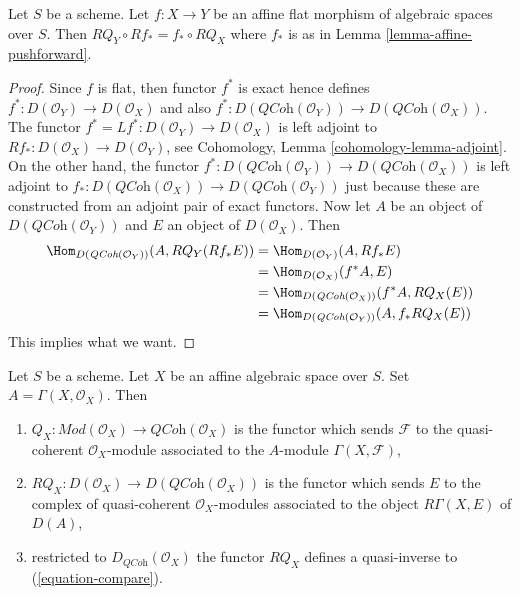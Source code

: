 \begin{lemma}
\label{lemma-affine-flat-coherator}
Let $S$ be a scheme. Let $f : X \to Y$ be an affine flat morphism of
algebraic spaces over $S$.
Then $RQ_Y \circ Rf_* = f_* \circ RQ_X$ where $f_*$ is as
in Lemma \ref{lemma-affine-pushforward}.
\end{lemma}

\begin{proof}
Since $f$ is flat, then functor $f^*$ is exact hence defines
$f^* : D(\mathcal{O}_Y) \to D(\mathcal{O}_X)$ and also
$f^* : D(\textit{QCoh}(\mathcal{O}_Y)) \to D(\textit{QCoh}(\mathcal{O}_X))$.
The functor $f^* = Lf^* : D(\mathcal{O}_Y) \to D(\mathcal{O}_X)$
is left adjoint to
$Rf_* : D(\mathcal{O}_X) \to D(\mathcal{O}_Y)$,
see Cohomology, Lemma \ref{cohomology-lemma-adjoint}.
On the other hand, the functor
$f^* : D(\textit{QCoh}(\mathcal{O}_Y)) \to D(\textit{QCoh}(\mathcal{O}_X))$
is left adjoint to
$f_* : D(\textit{QCoh}(\mathcal{O}_X)) \to D(\textit{QCoh}(\mathcal{O}_Y))$
just because these are constructed from an adjoint pair of exact functors.
Now let $A$ be an object of $D(\textit{QCoh}(\mathcal{O}_Y))$ and
$E$ an object of $D(\mathcal{O}_X)$. Then
\begin{align*}
\Hom_{D(\textit{QCoh}(\mathcal{O}_Y))}(A, RQ_Y(Rf_*E))
& =
\Hom_{D(\mathcal{O}_Y)}(A, Rf_*E) \\
& =
\Hom_{D(\mathcal{O}_X)}(f^*A, E) \\
& =
\Hom_{D(\textit{QCoh}(\mathcal{O}_X))}(f^*A, RQ_X(E)) \\
& =
\Hom_{D(\textit{QCoh}(\mathcal{O}_Y))}(A, f_*RQ_X(E))
\end{align*}
This implies what we want.
\end{proof}

\begin{lemma}
\label{lemma-affine-coherator}
Let $S$ be a scheme. Let $X$ be an affine algebraic space over $S$.
Set $A = \Gamma(X, \mathcal{O}_X)$. Then
\begin{enumerate}
\item $Q_X : \textit{Mod}(\mathcal{O}_X) \to \textit{QCoh}(\mathcal{O}_X)$
is the functor
which sends $\mathcal{F}$ to the quasi-coherent $\mathcal{O}_X$-module
associated to the $A$-module $\Gamma(X, \mathcal{F})$,
\item $RQ_X : D(\mathcal{O}_X) \to D(\textit{QCoh}(\mathcal{O}_X))$
is the functor which sends $E$ to the complex of quasi-coherent
$\mathcal{O}_X$-modules associated to the object $R\Gamma(X, E)$ of $D(A)$,
\item restricted to $D_{\textit{QCoh}}(\mathcal{O}_X)$ the functor
$RQ_X$ defines a quasi-inverse to (\ref{equation-compare}).
\end{enumerate}
\end{lemma}

